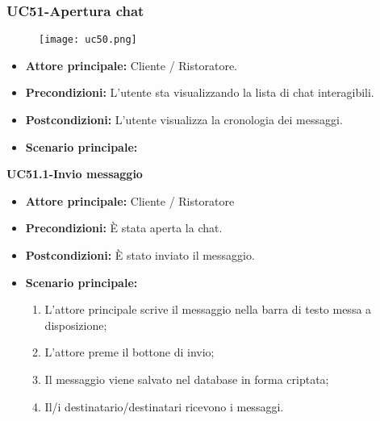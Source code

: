 \subsubsection{UC51-Apertura chat}
\begin{figure}[h] \texttt{[image: uc50.png]} \end{figure}
\begin{itemize}
\item \textbf{Attore principale:} Cliente / Ristoratore.
\item \textbf{Precondizioni:} L'utente sta visualizzando la lista di chat interagibili.
\item \textbf{Postcondizioni:} L'utente visualizza la cronologia dei messaggi.
\item \textbf{Scenario principale:}
\end{itemize}

\textbf{UC51.1-Invio messaggio}
\begin{itemize}
\item \textbf{Attore principale:} Cliente / Ristoratore
\item \textbf{Precondizioni:} È stata aperta la chat.
\item \textbf{Postcondizioni:} È stato inviato il messaggio.
\item \textbf{Scenario principale:}
\begin{enumerate}
    \item L'attore principale scrive il messaggio nella barra di testo messa a disposizione;
    \item L'attore preme il bottone di invio;
    \item Il messaggio viene salvato nel database in forma criptata;
    \item Il/i destinatario/destinatari ricevono i messaggi.
\end{enumerate}
\end{itemize}

